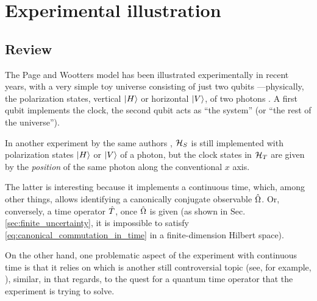 \section{Experimental illustration}
\label{sec:pw:qubit}\label{sec:pw:apps_first}

\subsection{Review}

The Page and Wootters model has been illustrated experimentally in recent years,
with a very simple toy universe consisting of just two qubits
---physically, the polarization states,
vertical $\ket{H}$ or horizontal $\ket{V}$,
of two photons \parencite{Moreva:synthetic,Moreva:illustration}.
A first qubit implements the clock, the second qubit acts as ``the system'' (or
``the rest of the universe'').

In another experiment by the same authors \parencite{Moreva_position}, $\mathcal{H}_S$ is still
implemented with
polarization states $\ket{H}$ or $\ket{V}$ of a photon, but the clock states in $\mathcal{H}_T$
are given by the \emph{position} of the same photon along the conventional $x$ axis.

The latter is interesting because it implements a continuous time,
which, among other things, allows identifying a canonically conjugate observable
$\hat{\Omega}$. Or, conversely, a time operator $\hat{T}$, once $\hat{\Omega}$ is given
(as shown in Sec. \ref{sec:finite_uncertainty}, it is impossible to satisfy \eqref{eq:canonical_commutation_in_time}
in a finite-dimension Hilbert space).

On the other hand, one problematic aspect of the experiment with continuous time
is that
it relies on  which is another
still controversial topic (see, for example, \cite{HawtonPhotonPosition}),
similar, in that regards, to the quest for a quantum time operator that the experiment is trying to solve.



